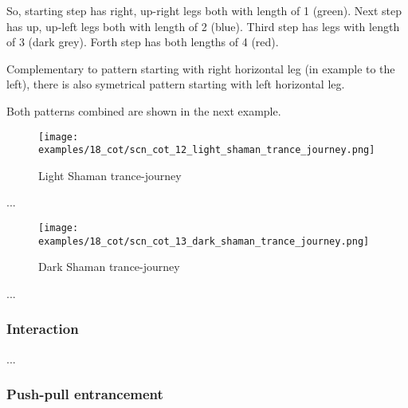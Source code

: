 So, starting step has right, up-right legs both with length of 1 (green). Next step
has up, up-left legs both with length of 2 (blue). Third step has legs with length
of 3 (dark grey). Forth step has both lengths of 4 (red).

Complementary to pattern starting with right horizontal leg (in example to the left),
there is also symetrical pattern starting with left horizontal leg.

Both patterns combined are shown in the next example.

\clearpage %

\noindent
\begin{figure}[!h]
\texttt{[image: examples/18\_cot/scn\_cot\_12\_light\_shaman\_trance\_journey.png]}
\caption{Light Shaman trance-journey}
\label{fig:scn_cot_12_light_shaman_trance_journey}
\end{figure}

...

\clearpage %

\noindent
\begin{figure}[!h]
\texttt{[image: examples/18\_cot/scn\_cot\_13\_dark\_shaman\_trance\_journey.png]}
\caption{Dark Shaman trance-journey}
\label{fig:scn_cot_13_dark_shaman_trance_journey}
\end{figure}

...

\clearpage %

\subsubsection*{Interaction}

...

\clearpage %

\subsubsection*{Push-pull entrancement}

